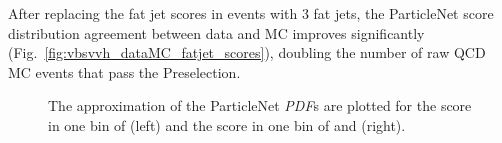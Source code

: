 After replacing the fat jet scores in events with 3 fat jets, the ParticleNet score distribution agreement between data and MC improves significantly (Fig.~\ref{fig:vbsvvh_dataMC_fatjet_scores}), doubling the number of raw QCD MC events that pass the Preselection.

\begin{figure}[htb]
    \centering
    \qquad
    \caption{
        The approximation of the ParticleNet \textit{PDF}s are plotted for the \Xtobb score in one bin of \pt (left) and the \XWtoqq score in one bin of \pt and \Xtobb (right). 
    }
    \label{fig:vbsvvh_pnetpdf}
\end{figure}

